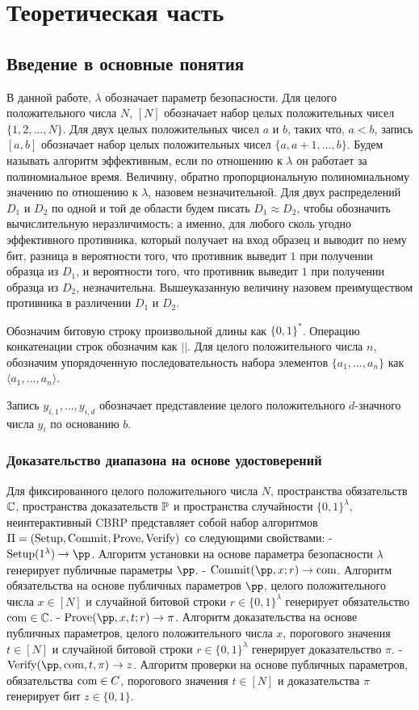 \chapter{Теоретическая часть}
\section{Введение в основные понятия} %
В данной работе, $\lambda$ обозначает параметр безопасности.
Для целого положительного числа $N$, $[N]$ обозначает набор целых положительных чисел $\{1, 2, \dots, N\}$.
Для двух целых положительных чисел $a$ и $b$, таких что, $a < b$, запись $[a, b]$ обозначает набор целых положительных чисел $\{a, a + 1, \dots, b\}$.
Будем называть алгоритм эффективным, если по отношению к $\lambda$ он работает за полиномиальное время.
Величину, обратно пропорциональную полиномиальному значению по отношению к $\lambda$, назовем незначительной.
Для двух распределений $D_1$ и $D_2$ по одной и той де области будем писать $D_1 \approx D_2$, чтобы обозначить вычислительную неразличимость; а именно, для любого сколь угодно эффективного противника, который получает на вход образец и выводит по нему бит, разница в вероятности того, что противник выведит $1$ при получении образца из $D_1$, и вероятности того, что противник выведит $1$ при получении образца из $D_2$, незначительна.
Вышеуказанную величину назовем преимуществом противника в различении $D_1$ и $D_2$.

Обозначим битовую строку произвольной длины как $\{0, 1\}^*$.
Операцию конкатенации строк обозначим как $||$.
Для целого положительного числа $n$, обозначим упорядоченную последовательность набора элементов $\{a_1, \dots, a_n\}$ как $\langle a_1, \dots, a_n \rangle$.

Запись $y_{i, 1}, \dots, y_{i, d}$ обозначает представление целого положительного $d$-значного числа $y_i$ по основанию $b$.

\subsection{Доказательство диапазона на основе удостоверений} %
Для фиксированного целого положительного числа $N$, пространства обязательств $\C$, пространства доказательств $\P$ и пространства случайности $\{0, 1\}^\lambda$, неинтерактивный CBRP представляет собой набор алгоритмов $\Pi = (\Setup, \Commit, \Prove, \Verify)$ со следующими свойствами:
- $\Setup(1^\lambda) \rightarrow \pp$. Алгоритм установки на основе параметра безопасности $\lambda$ генерирует публичные параметры $\pp$.
- $\Commit(\pp, x; r) \rightarrow \com$. Алгоритм обязательства на основе публичных параметров $\pp$, целого положительного числа $x \in [N]$ и случайной битовой строки $r \in \{0, 1\}^\lambda$ генерирует обязательство $\com \in \C$.
- $\Prove(\pp, x, t; r) \rightarrow \pi$. Алгоритм доказательства на основе публичных параметров, целого положительного числа $x$, порогового значения $t \in [N]$ и случайной битовой строки $r \in \{0, 1\}^\lambda$ генерирует доказательство $\pi$.
- $\Verify(\pp, \com, t, \pi) \rightarrow z$. Алгоритм проверки на основе публичных параметров, обязательства $\com \in C$, порогового значения $t \in [N]$ и доказательства $\pi$ генерирует бит $z \in \{0, 1\}$.


